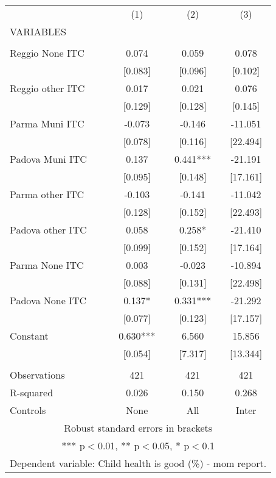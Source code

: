 \begin{tabular}{lccc} \hline
 & (1) & (2) & (3) \\
VARIABLES &  &  &  \\ \hline
 &  &  &  \\
Reggio None ITC & 0.074 & 0.059 & 0.078 \\
 & [0.083] & [0.096] & [0.102] \\
Reggio other ITC & 0.017 & 0.021 & 0.076 \\
 & [0.129] & [0.128] & [0.145] \\
Parma Muni ITC & -0.073 & -0.146 & -11.051 \\
 & [0.078] & [0.116] & [22.494] \\
Padova Muni ITC & 0.137 & 0.441*** & -21.191 \\
 & [0.095] & [0.148] & [17.161] \\
Parma other ITC & -0.103 & -0.141 & -11.042 \\
 & [0.128] & [0.152] & [22.493] \\
Padova other ITC & 0.058 & 0.258* & -21.410 \\
 & [0.099] & [0.152] & [17.164] \\
Parma None ITC & 0.003 & -0.023 & -10.894 \\
 & [0.088] & [0.131] & [22.498] \\
Padova None ITC & 0.137* & 0.331*** & -21.292 \\
 & [0.077] & [0.123] & [17.157] \\
Constant & 0.630*** & 6.560 & 15.856 \\
 & [0.054] & [7.317] & [13.344] \\
 &  &  &  \\
Observations & 421 & 421 & 421 \\
R-squared & 0.026 & 0.150 & 0.268 \\
 Controls & None & All & Inter \\ \hline
\multicolumn{4}{c}{ Robust standard errors in brackets} \\
\multicolumn{4}{c}{ *** p$<$0.01, ** p$<$0.05, * p$<$0.1} \\
\multicolumn{4}{c}{ Dependent variable: Child health is good (\%) - mom report.} \\
\end{tabular}
